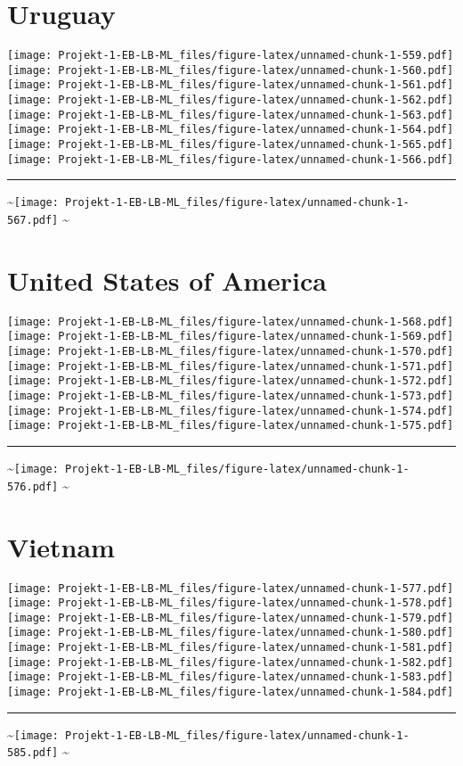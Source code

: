 \documentclass[]{article}
\begin{document}
\section{Uruguay}\label{uruguay}

\texttt{[image: Projekt-1-EB-LB-ML\_files/figure-latex/unnamed-chunk-1-559.pdf]}
\texttt{[image: Projekt-1-EB-LB-ML\_files/figure-latex/unnamed-chunk-1-560.pdf]}
\texttt{[image: Projekt-1-EB-LB-ML\_files/figure-latex/unnamed-chunk-1-561.pdf]}
\texttt{[image: Projekt-1-EB-LB-ML\_files/figure-latex/unnamed-chunk-1-562.pdf]}
\texttt{[image: Projekt-1-EB-LB-ML\_files/figure-latex/unnamed-chunk-1-563.pdf]}
\texttt{[image: Projekt-1-EB-LB-ML\_files/figure-latex/unnamed-chunk-1-564.pdf]}
\texttt{[image: Projekt-1-EB-LB-ML\_files/figure-latex/unnamed-chunk-1-565.pdf]}
\texttt{[image: Projekt-1-EB-LB-ML\_files/figure-latex/unnamed-chunk-1-566.pdf]}
\bigskip\hrule\bigskip
\textasciitilde{}\hfill\texttt{[image: Projekt-1-EB-LB-ML\_files/figure-latex/unnamed-chunk-1-567.pdf]}
\hfill \textasciitilde{} \vfill\eject

\section{United States of America}\label{united-states-of-america}

\texttt{[image: Projekt-1-EB-LB-ML\_files/figure-latex/unnamed-chunk-1-568.pdf]}
\texttt{[image: Projekt-1-EB-LB-ML\_files/figure-latex/unnamed-chunk-1-569.pdf]}
\texttt{[image: Projekt-1-EB-LB-ML\_files/figure-latex/unnamed-chunk-1-570.pdf]}
\texttt{[image: Projekt-1-EB-LB-ML\_files/figure-latex/unnamed-chunk-1-571.pdf]}
\texttt{[image: Projekt-1-EB-LB-ML\_files/figure-latex/unnamed-chunk-1-572.pdf]}
\texttt{[image: Projekt-1-EB-LB-ML\_files/figure-latex/unnamed-chunk-1-573.pdf]}
\texttt{[image: Projekt-1-EB-LB-ML\_files/figure-latex/unnamed-chunk-1-574.pdf]}
\texttt{[image: Projekt-1-EB-LB-ML\_files/figure-latex/unnamed-chunk-1-575.pdf]}
\bigskip\hrule\bigskip
\textasciitilde{}\hfill\texttt{[image: Projekt-1-EB-LB-ML\_files/figure-latex/unnamed-chunk-1-576.pdf]}
\hfill \textasciitilde{} \vfill\eject

\section{Vietnam}\label{vietnam}

\texttt{[image: Projekt-1-EB-LB-ML\_files/figure-latex/unnamed-chunk-1-577.pdf]}
\texttt{[image: Projekt-1-EB-LB-ML\_files/figure-latex/unnamed-chunk-1-578.pdf]}
\texttt{[image: Projekt-1-EB-LB-ML\_files/figure-latex/unnamed-chunk-1-579.pdf]}
\texttt{[image: Projekt-1-EB-LB-ML\_files/figure-latex/unnamed-chunk-1-580.pdf]}
\texttt{[image: Projekt-1-EB-LB-ML\_files/figure-latex/unnamed-chunk-1-581.pdf]}
\texttt{[image: Projekt-1-EB-LB-ML\_files/figure-latex/unnamed-chunk-1-582.pdf]}
\texttt{[image: Projekt-1-EB-LB-ML\_files/figure-latex/unnamed-chunk-1-583.pdf]}
\texttt{[image: Projekt-1-EB-LB-ML\_files/figure-latex/unnamed-chunk-1-584.pdf]}
\bigskip\hrule\bigskip
\textasciitilde{}\hfill\texttt{[image: Projekt-1-EB-LB-ML\_files/figure-latex/unnamed-chunk-1-585.pdf]}
\hfill \textasciitilde{} \vfill\eject
\end{document}
